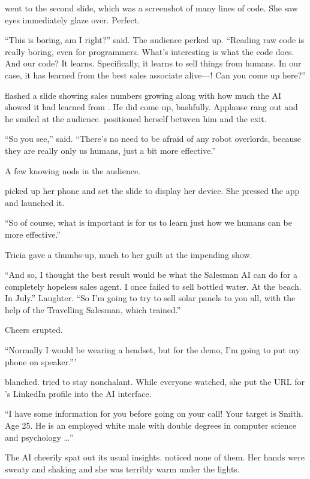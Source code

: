{\protag} went to the second slide, which was a screenshot of many lines of code. She saw eyes immediately glaze over. Perfect.

``This is boring, am I right?'' {\protag} said. The audience perked up. ``Reading raw code is really boring, even for programmers. What's interesting is what the code does. And our code? It learns. Specifically, it learns to sell things from humans. In our case, it has learned from the best sales associate alive---{\energyJerk}! Can you come up here?''

{\protag} flashed a slide showing sales numbers growing along with how much the AI showed it had learned from {\energyJerk}. He did come up, bashfully. Applause rang out and he smiled at the audience. {\protag} positioned herself between him and the exit.

``So you see,'' {\protag} said. ``There's no need to be afraid of any robot overlords, because they are really only us humans, just a bit more effective.''

A few knowing nods in the audience.

{\protag} picked up her phone and set the slide to display her device. She pressed the app and launched it.

``So of course, what is important is for us to learn just how we humans can be more effective.''

Tricia gave {\protag} a thumbs-up, much to her guilt at the impending show.

``And so, I thought the best result would be what the Salesman AI can do for a completely hopeless sales agent. I once failed to sell bottled water. At the beach. In July.'' Laughter. ``So I'm going to try to sell solar panels to you all, with the help of the Travelling Salesman, which {\energyJerk} trained.''

Cheers erupted.

``Normally I would be wearing a headset, but for the demo, I'm going to put my phone on speaker.'''

{\energyJerk} blanched. {\protag} tried to stay nonchalant. While everyone watched, she put the URL for {\energyJerk}'s LinkedIn profile into the AI interface.

``I have some information for you before going on your call! Your target is {\energyJerk} Smith. Age 25. He is an employed white male with double degrees in computer science and psychology \dots''

The AI cheerily spat out its usual insights. {\protag} noticed none of them. Her hands were sweaty and shaking and she was terribly warm under the lights.

